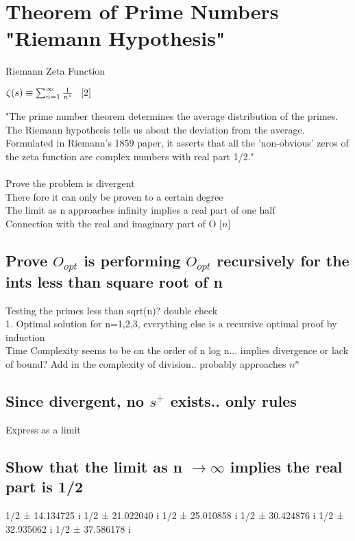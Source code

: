 \documentclass[11pt]{article}
\begin{document}
\section{Theorem of Prime Numbers "Riemann Hypothesis"}
Riemann Zeta Function
\begin{center}
$
\zeta (s) \equiv \sum_{n=1}^{\infty} \frac{1}{n^s} \hspace{3mm} \lbrack 2 \rbrack
$
\end{center}
"The prime number theorem determines the average distribution of the primes. The Riemann hypothesis tells us about the deviation from the average. Formulated in Riemann's 1859 paper, it asserts that all the 'non-obvious' zeros of the zeta function are complex numbers with real part 1/2." \rbrack\\
\\
Prove the problem is divergent\\
There fore it can only be proven to a certain degree\\
The limit as n approaches infinity implies a real part of one half\\
Connection with the real and imaginary part of O $\lbrack n \rbrack$

\subsection{Prove $O_{opt}$ is performing $O_{opt}$ recursively for the ints less than square root of n}
Testing the primes less than sqrt(n)? double check \\
1. Optimal solution for n=1,2,3, everything else is a recursive optimal proof by induction\\
Time Complexity seems to be on the order of n log n... implies divergence or lack of bound? Add in the complexity of division.. probably approaches $n^n$


\subsection{Since divergent, no $s^{+}$ exists.. only rules}
Express as a limit

\subsection{Show that the limit as n $\rightarrow \infty$ implies the real part is 1/2}
1/2 ± 14.134725 i
1/2 ± 21.022040 i
1/2 ± 25.010858 i
1/2 ± 30.424876 i
1/2 ± 32.935062 i
1/2 ± 37.586178 i
\end{document}
